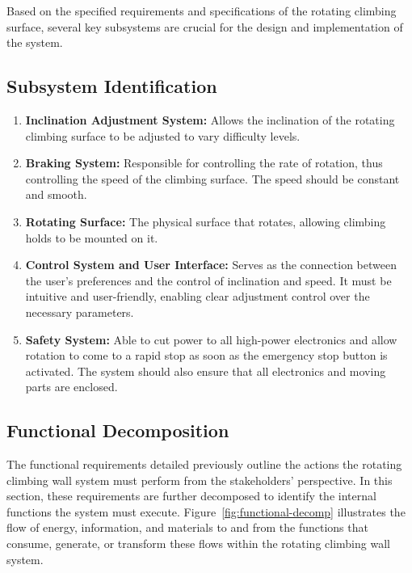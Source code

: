 Based on the specified requirements and specifications of the rotating climbing surface, several key subsystems are crucial for the design and implementation of the system.

\subsection{Subsystem Identification}

\begin{enumerate}
    \item \textbf{Inclination Adjustment System:} Allows the inclination of the rotating climbing surface to be adjusted to vary difficulty levels.
    \item \textbf{Braking System:} Responsible for controlling the rate of rotation, thus controlling the speed of the climbing surface. The speed should be constant and smooth.
    \item \textbf{Rotating Surface:} The physical surface that rotates, allowing climbing holds to be mounted on it.
    \item \textbf{Control System and User Interface:} Serves as the connection between the user's preferences and the control of inclination and speed. It must be intuitive and user-friendly, enabling clear adjustment control over the necessary parameters.
    \item \textbf{Safety System:} Able to cut power to all high-power electronics and allow rotation to come to a rapid stop as soon as the emergency stop button is activated. The system should also ensure that all electronics and moving parts are enclosed.
\end{enumerate}

\subsection{Functional Decomposition}

The functional requirements detailed previously outline the actions the rotating climbing wall system must perform from the stakeholders' perspective. In this section, these requirements are further decomposed to identify the internal functions the system must execute. Figure~\ref{fig:functional-decomp} illustrates the flow of energy, information, and materials to and from the functions that consume, generate, or transform these flows within the rotating climbing wall system.

